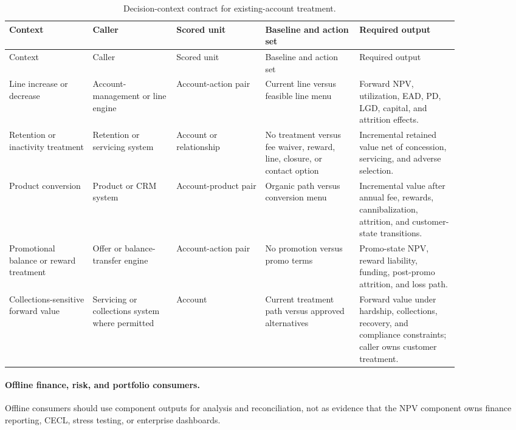 \documentclass[11pt]{article}
\newcommand{\1}{\mathbf{1}}
\begin{document}
\begin{longtable}{L{0.16\linewidth}L{0.16\linewidth}L{0.17\linewidth}L{0.18\linewidth}L{0.19\linewidth}}
\caption{Decision-context contract for existing-account treatment.}
\label{tab:acct-contract}\\
\toprule
Context & Caller & Scored unit & Baseline and action set & Required output \\
\midrule
\endfirsthead
\toprule
Context & Caller & Scored unit & Baseline and action set & Required output \\
\midrule
\endhead
Line increase or decrease
  & Account-management or line engine
  & Account-action pair
  & Current line versus feasible line menu
  & Forward NPV, utilization, EAD, PD, LGD, capital, and attrition effects. \\
Retention or inactivity treatment
  & Retention or servicing system
  & Account or relationship
  & No treatment versus fee waiver, reward, line, closure, or contact option
  & Incremental retained value net of concession, servicing, and adverse
    selection. \\
Product conversion
  & Product or CRM system
  & Account-product pair
  & Organic path versus conversion menu
  & Incremental value after annual fee, rewards, cannibalization, attrition,
    and customer-state transitions. \\
Promotional balance or reward treatment
  & Offer or balance-transfer engine
  & Account-action pair
  & No promotion versus promo terms
  & Promo-state NPV, reward liability, funding, post-promo attrition, and loss
    path. \\
Collections-sensitive forward value
  & Servicing or collections system where permitted
  & Account
  & Current treatment path versus approved alternatives
  & Forward value under hardship, collections, recovery, and compliance
    constraints; caller owns customer treatment. \\
\bottomrule
\end{longtable}

\paragraph{Offline finance, risk, and portfolio consumers.}
Offline consumers should use component outputs for analysis and reconciliation,
not as evidence that the NPV component owns finance reporting, CECL, stress
testing, or enterprise dashboards.
\end{document}

